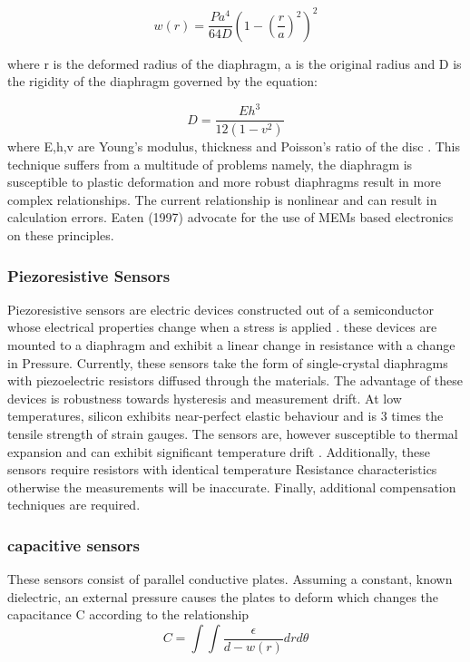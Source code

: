 \begin{equation}
    w(r) = \frac{Pa^4}{64D}(1- (\frac{r}{a})^2)^2
\end{equation}

where r is the deformed radius of the diaphragm, a is the original radius and D is the  rigidity of the diaphragm governed by the equation:

\begin{equation}
    D = \frac{Eh^3}{12(1-v^2)}
\end{equation}
where E,h,v are Young's modulus, thickness and Poisson's ratio of the disc \cite{eaton1997micromachined}. This technique suffers from a multitude of problems namely, the diaphragm is susceptible to plastic deformation and more robust diaphragms result in more complex relationships. The current relationship is nonlinear and can result in calculation errors. Eaten (1997) advocate for the use of MEMs based electronics on these principles.
\subsubsection{Piezoresistive Sensors}

Piezoresistive sensors are electric devices constructed out of a semiconductor whose electrical properties change when a stress is applied \cite{eaton1997micromachined}. these devices are mounted to a diaphragm and exhibit a linear change in resistance with a change in Pressure. Currently, these sensors take the form of single-crystal diaphragms with piezoelectric resistors diffused through the materials. The advantage of these devices is robustness towards hysteresis and measurement drift. At low temperatures, silicon exhibits near-perfect elastic behaviour and is  3 times the tensile strength of strain gauges\cite{eaton1997micromachined}. The sensors are, however susceptible to thermal expansion and can exhibit significant temperature drift \cite{samaun1971ic}. Additionally, these sensors require resistors with identical temperature Resistance characteristics otherwise the measurements will be inaccurate. Finally, additional compensation techniques are required.

\subsubsection{capacitive sensors}

These sensors consist of parallel conductive plates. Assuming a constant, known dielectric, an external pressure causes the plates to deform which changes the capacitance C according to the relationship \cite{eaton1997micromachined}
\begin{equation}
    C = \int \int \frac{\epsilon}{d - w(r)}drd\theta
\end{equation}

